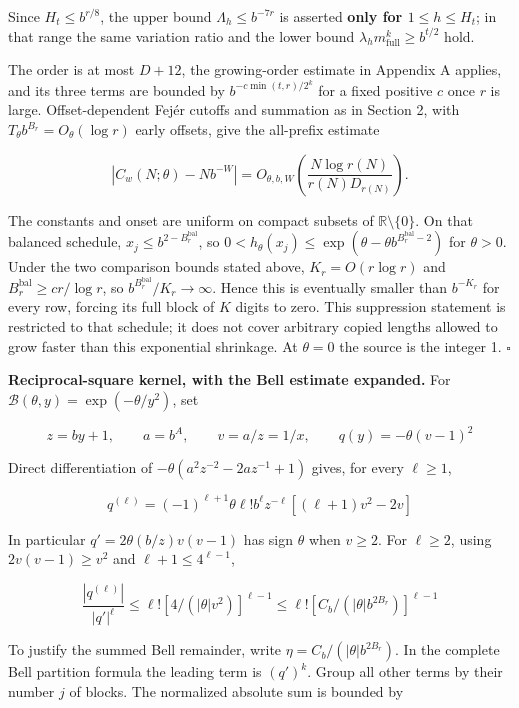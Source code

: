 \documentclass[11pt,a4paper]{article}
\begin{document}
Since \(H_t\le b^{r/8}\), the upper bound \(\Lambda_h\le b^{-7r}\) is
asserted \textbf{only for \(1\le h\le H_t\)}; in that range the same
variation ratio and the lower bound
\(\lambda_h m_{\mathrm{full}}^k\ge b^{t/2}\) hold.

The order is at most \(D+12\), the growing-order estimate in Appendix A
applies, and its three terms are bounded by \(b^{-c \min(t,r)/2^k}\) for
a fixed positive \(c\) once \(r\) is large. Offset-dependent Fejér
cutoffs and summation as in Section 2, with
\(T_\theta b^{B_r}=O_\theta(\log r)\) early offsets, give the all-prefix
estimate

\[
|C_w(N;\theta)-Nb^{-W}| = O_{\theta,b,W}\left(\frac{N\log r(N)}{r(N)D_{r(N)}}\right).\tag{6.2}
\]

The constants and onset are uniform on compact subsets of
\(\mathbb R\setminus\lbrace 0\rbrace\). On that balanced schedule,
\(x_j\le b^{2-B_r^{\mathrm{bal}}}\), so
\(0< h_\theta(x_j)\le \exp(\theta-\theta b^{B_r^{\mathrm{bal}}-2})\) for
\(\theta>0\). Under the two comparison bounds stated above,
\(K_r=O(r \log r)\) and \(B_r^{\mathrm{bal}}\ge c r/\log r\), so
\(b^{B_r^{\mathrm{bal}}}/K_r\to \infty\). Hence this is eventually
smaller than \(b^{-K_r}\) for every row, forcing its full block of \(K\)
digits to zero. This suppression statement is restricted to that
schedule; it does not cover arbitrary copied lengths allowed to grow
faster than this exponential shrinkage. At \(\theta=0\) the source is
the integer 1. \(\square\)

\textbf{Reciprocal-square kernel, with the Bell estimate expanded.} For
\(\mathcal B(\theta,y)=\exp(-\theta/y^2)\), set

\[
z=by+1,\qquad a=b^A,\qquad v=a/z=1/x,\qquad q(y)=-\theta(v-1)^2
\]

Direct differentiation of \(-\theta(a^2 z^{-2}-2a z^{-1}+1)\) gives, for
every \(\ell\ge 1\),

\[
q^{(\ell)}=(-1)^{\ell+1} \theta \ell! b^\ell z^{-\ell} [(\ell+1)v^2-2v]
\]

In particular \(q'=2\theta(b/z)v(v-1)\) has sign \(\theta\) when
\(v\ge 2\). For \(\ell\ge 2\), using \(2v(v-1)\ge v^2\) and
\(\ell+1\le 4^{\ell-1}\),

\[
\frac{|q^{(\ell)}|}{|q'|^\ell} \le  \ell! [4/(|\theta|v^2)]^{\ell-1}
\le  \ell! [C_b/(|\theta|b^{2B_r})]^{\ell-1}
\]

To justify the summed Bell remainder, write
\(\eta=C_b/(|\theta|b^{2B_r})\). In the complete Bell partition formula
the leading term is \((q')^k\). Group all other terms by their number
\(j\) of blocks. The normalized absolute sum is bounded by
\end{document}
